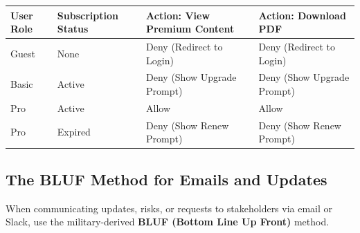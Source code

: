 \documentclass[
  11pt,
  openany,
  oneside]{book}
\begin{document}
\begin{longtable}[]{@{}
  >{\raggedright\arraybackslash}p{}
  >{\raggedright\arraybackslash}p{}
  >{\raggedright\arraybackslash}p{}
  >{\raggedright\arraybackslash}p{}@{}}
\toprule\noalign{}
\begin{minipage}[b]{\linewidth}\raggedright
User Role
\end{minipage} & \begin{minipage}[b]{\linewidth}\raggedright
Subscription Status
\end{minipage} & \begin{minipage}[b]{\linewidth}\raggedright
Action: View Premium Content
\end{minipage} & \begin{minipage}[b]{\linewidth}\raggedright
Action: Download PDF
\end{minipage} \\
\midrule\noalign{}
\endhead
\bottomrule\noalign{}
\endlastfoot
Guest & None & Deny (Redirect to Login) & Deny (Redirect to Login) \\
Basic & Active & Deny (Show Upgrade Prompt) & Deny (Show Upgrade
Prompt) \\
Pro & Active & Allow & Allow \\
Pro & Expired & Deny (Show Renew Prompt) & Deny (Show Renew Prompt) \\
\end{longtable}

\subsection{The BLUF Method for Emails and
Updates}\label{the-bluf-method-for-emails-and-updates}

When communicating updates, risks, or requests to stakeholders via email
or Slack, use the military-derived \textbf{BLUF (Bottom Line Up Front)}
method.
\end{document}

